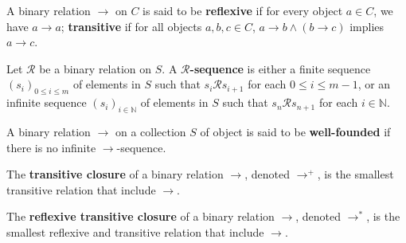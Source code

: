 \documentclass{book}
\begin{document}
  \begin{definition}
    \label{def:binary_relation:reflexivity_transitivity}
    A binary relation \( \to \) on \(C\) is said to be \textbf{reflexive} if for every object \(a \in C\), we have \(a \to a\); \textbf{transitive} if for all objects \( a, b, c \in C\), \( a \to b \land (b \to c) \) implies \(a \to c\).
  \end{definition}
  
  \begin{definition}
    \label{def:binary_relation:sequence}
    Let \(\mathcal{R}\) be a binary relation on $S$.
    A \textbf{\( \mathcal{R} \)-sequence} is either a finite sequence \( \left( s_i \right)_{0 \leq i \leq m} \) of elements in $S$ such that \(s_i \mathcal{R} s_{i+1}\) for each \( 0 \leq i \leq m-1\), or an infinite sequence \((s_i)_{i \in \mathbb{N}}\) of elements in $S$ such that \(s_n \mathcal{R} s_{n+1}\) for each \(i \in \mathbb{N}\).
\end{definition}

\begin{definition}
    \label{def:binary_relation:well_founded}
    A binary relation $\to$ on a collection $S$ of object is said to be \textbf{well-founded} if there is no infinite $\to$-sequence. 
\end{definition}

\begin{definition}
    \label{def:binary_relation:transitive_closure}
    The \textbf{transitive closure} of a binary relation $\to$, denoted $\to^+$, is the smallest transitive relation that include \( \to \).
  \end{definition}
  
  \begin{definition}
    \label{def:binary_relation:reflexive_transitive_closure}
    The \textbf{reflexive transitive closure} of a binary relation $\to$, denoted $\to^*$, is the smallest reflexive and transitive relation that include \( \to \).
  \end{definition}
\end{document}
